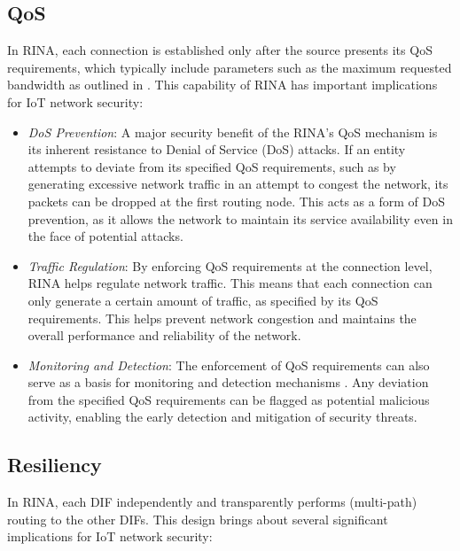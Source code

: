 \documentclass{ieeeaccess}
\begin{document}
\subsection{QoS}

In RINA, each connection is established only after the source presents its QoS requirements, which typically include parameters such as the maximum requested bandwidth as outlined in \cite{gaixas2016assuring}. This capability of RINA has important implications for IoT network security:

\begin{itemize}
	\item \textit{DoS Prevention}: A major security benefit of the RINA's QoS mechanism is its inherent resistance to Denial of Service (DoS) attacks. If an entity attempts to deviate from its specified QoS requirements, such as by generating excessive network traffic in an attempt to congest the network, its packets can be dropped at the first routing node. This acts as a form of DoS prevention, as it allows the network to maintain its service availability even in the face of potential attacks.
	\item \textit{Traffic Regulation}: By enforcing QoS requirements at the connection level, RINA helps regulate network traffic. This means that each connection can only generate a certain amount of traffic, as specified by its QoS requirements. This helps prevent network congestion and maintains the overall performance and reliability of the network.

	\item \textit{Monitoring and Detection}: The enforcement of QoS requirements can also serve as a basis for monitoring and detection mechanisms \cite{protogerou2021graph}. Any deviation from the specified QoS requirements can be flagged as potential malicious activity, enabling the early detection and mitigation of security threats.
\end{itemize}

\subsection{Resiliency}

In RINA, each DIF independently and transparently performs (multi-path) routing to the other DIFs. This design brings about several significant implications for IoT network security:
\end{document}
